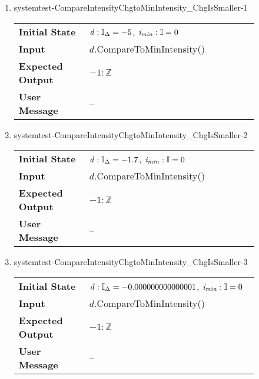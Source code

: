 \begin{enumerate}
    \item{systemtest-CompareIntensityChgtoMinIntensity\_ChgIsSmaller-1}
    \begin{table}[H]
        \centering
        \begin{tabular}{P{0.25\linewidth}P{0.6\linewidth}}
            \toprule
            \textbf{Initial State} & $\mathit{d} : \mathbb{I}_{\Delta} = -5$,
            $\mathit{i_{min}} : \mathbb{I} = 0$ \\
            \textbf{Input} & $\mathit{d}$.CompareToMinIntensity() \\ \midrule
            \textbf{Expected Output} & $-1 : \mathbb{Z}$ \\
            \textbf{User Message} & -- \\ \bottomrule
        \end{tabular}
    \end{table}

    \item{systemtest-CompareIntensityChgtoMinIntensity\_ChgIsSmaller-2}
    \begin{table}[H]
        \centering
        \begin{tabular}{P{0.25\linewidth}P{0.6\linewidth}}
            \toprule
            \textbf{Initial State} & $\mathit{d} : \mathbb{I}_{\Delta} = -1.7$,
            $\mathit{i_{min}} : \mathbb{I} = 0$ \\
            \textbf{Input} & $\mathit{d}$.CompareToMinIntensity() \\ \midrule
            \textbf{Expected Output} & $-1 : \mathbb{Z}$ \\
            \textbf{User Message} & -- \\ \bottomrule
        \end{tabular}
    \end{table}

    \item{systemtest-CompareIntensityChgtoMinIntensity\_ChgIsSmaller-3}
    \begin{table}[H]
        \centering
        \begin{tabular}{P{0.25\linewidth}P{0.6\linewidth}}
            \toprule
            \textbf{Initial State} & $\mathit{d} : \mathbb{I}_{\Delta} =
            -0.000000000000001$, $\mathit{i_{min}} : \mathbb{I} = 0$
            \\
            \textbf{Input} & $\mathit{d}$.CompareToMinIntensity() \\ \midrule
            \textbf{Expected Output} & $-1 : \mathbb{Z}$ \\
            \textbf{User Message} & -- \\ \bottomrule
        \end{tabular}
    \end{table}


\end{enumerate}
